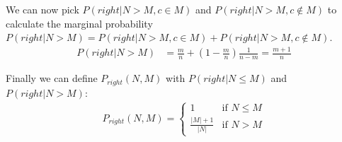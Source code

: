 We can now pick $P(right | N > M, c \in M)$ and $P(right | N > M, c \notin M)$ to 
calculate the marginal probability $P(right | N > M) = P(right | N > M, c \in M) + P(right | N > M, c \notin M)$.
\begin{align*}
P(right | N > M) &= \frac{m}{n} + (1 - \frac{m}{n}) \frac{1}{n - m} = \frac{m + 1}{n}
\end{align*}

Finally we can define $P_{right}(N, M)$ with $P(right | N \leq M)$ and $P(right | N > M)$:
\begin{align*}
P_{right}(N, M) = 
\begin{cases} 
1             & \mbox{if } N \leq M \\ 
\frac{|M|+1}{|N|} & \mbox{if } N > M
\end{cases}
\end{align*}
